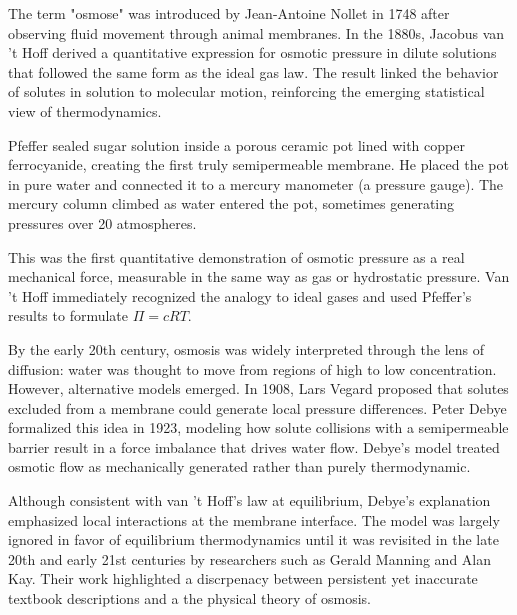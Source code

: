 \begin{historical}
The term "osmose" was introduced by Jean-Antoine Nollet in 1748 after observing fluid movement through animal membranes. In the 1880s, Jacobus van 't Hoff derived a quantitative expression for osmotic pressure in dilute solutions that followed the same form as the ideal gas law. The result linked the behavior of solutes in solution to molecular motion, reinforcing the emerging statistical view of thermodynamics.

Pfeffer sealed sugar solution inside a porous ceramic pot lined with copper ferrocyanide, creating the first truly semipermeable membrane. He placed the pot in pure water and connected it to a mercury manometer (a pressure gauge). The mercury column climbed as water entered the pot, sometimes generating pressures over 20 atmospheres.

This was the first quantitative demonstration of osmotic pressure as a real mechanical force, measurable in the same way as gas or hydrostatic pressure. Van 't Hoff immediately recognized the analogy to ideal gases and used Pfeffer's results to formulate $\Pi = cRT$.

By the early 20th century, osmosis was widely interpreted through the lens of diffusion: water was thought to move from regions of high to low concentration. However, alternative models emerged. In 1908, Lars Vegard proposed that solutes excluded from a membrane could generate local pressure differences. Peter Debye formalized this idea in 1923, modeling how solute collisions with a semipermeable barrier result in a force imbalance that drives water flow. Debye's model treated osmotic flow as mechanically generated rather than purely thermodynamic.

Although consistent with van ’t Hoff’s law at equilibrium, Debye’s explanation emphasized local interactions at the membrane interface. The model was largely ignored in favor of equilibrium thermodynamics until it was revisited in the late 20th and early 21st centuries by researchers such as Gerald Manning and Alan Kay. Their work highlighted a discrpenacy between persistent yet inaccurate textbook descriptions and a the physical theory of osmosis.
\end{historical}
